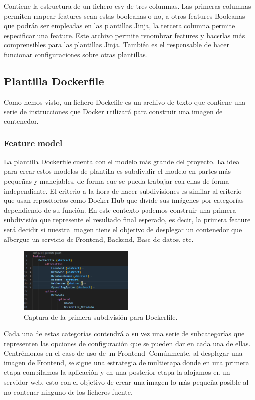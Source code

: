 \documentclass[12pt, a4paper, twoside]{article}
\begin{document}
Contiene la estructura de un fichero csv de tres columnas. Las primeras columnas permiten mapear features sean estas booleanas o no, a otros features Booleanas que podrán ser empleadas en las plantillas Jinja, la tercera columna permite especificar una feature.
Este archivo permite renombrar features y hacerlas más comprensibles para las plantillas Jinja. También es el responsable de hacer funcionar configuraciones sobre otras plantillas.

\newpage
\subsection{Plantilla Dockerfile}
\label{sec:Plantilla Dockerfile}
Como hemos visto, un fichero Dockefile es un archivo de texto que contiene una serie de instrucciones que Docker \cite{docker} utilizará para construir una imagen de contenedor.
\subsubsection{Feature model}

La plantilla Dockerfile cuenta con el modelo más grande del proyecto. La idea para crear estos modelos de plantilla es subdividir el modelo en partes más pequeñas y manejables, de forma que se pueda trabajar con ellas de forma independiente.
El criterio a la hora de hacer subdivisiones es similar al criterio que usan repositorios como Docker Hub \cite{docker_hub} que divide sus imágenes por categorías dependiendo de su función.
En este contexto podemos construir una primera subdivisión que represente el resultado final esperado, es decir, la primera feature será decidir si nuestra imagen tiene el objetivo de desplegar un contenedor que albergue un servicio de Frontend, Backend, Base de datos, etc.

\begin{figure}[h]
	\centering
	  \includegraphics[width=0.5\textwidth]{Dockerfile.uvl.png}
	\caption{Captura de la primera subdivisión para Dockerfile.}
\end{figure}

Cada una de estas categorías contendrá a su vez una serie de subcategorías que representen las opciones de configuración que se pueden dar en cada una de ellas.
\\Centrémonos en el caso de uso de un Frontend. Comúnmente, al desplegar una imagen de Frontend, se sigue una estrategia de multietapa \cite{docker_multistage} donde en una primera etapa compilamos la aplicación 
y en una posterior etapa la alojamos en un servidor web, esto con el objetivo de crear una imagen lo más pequeña posible al no contener ninguno de los ficheros fuente.
\end{document}
